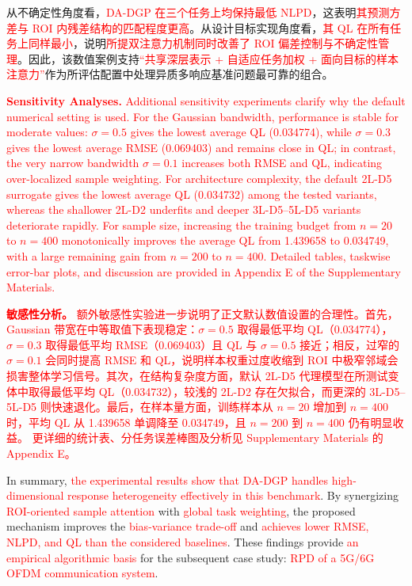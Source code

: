 \documentclass[11pt]{article}
\begin{document}
从不确定性角度看，\textcolor{red}{DA-DGP 在三个任务上均保持最低 NLPD}，这表明\textcolor{red}{其预测方差与 ROI 内残差结构的匹配程度更高}。从设计目标实现角度看，\textcolor{red}{其 QL 在所有任务上同样最小}，说明\textcolor{red}{所提双注意力机制同时改善了 ROI 偏差控制与不确定性管理}。因此，该数值案例支持\textcolor{red}{“共享深层表示 + 自适应任务加权 + 面向目标的样本注意力”}作为所评估配置中处理异质多响应基准问题最可靠的组合。

\textbf{\textcolor{red}{Sensitivity Analyses.}} \textcolor{red}{Additional sensitivity experiments clarify why the default numerical setting is used. For the Gaussian bandwidth, performance is stable for moderate values: $\sigma=0.5$ gives the lowest average QL (0.034774), while $\sigma=0.3$ gives the lowest average RMSE (0.069403) and remains close in QL; in contrast, the very narrow bandwidth $\sigma=0.1$ increases both RMSE and QL, indicating over-localized sample weighting. For architecture complexity, the default 2L-D5 surrogate gives the lowest average QL (0.034732) among the tested variants, whereas the shallower 2L-D2 underfits and deeper 3L-D5--5L-D5 variants deteriorate rapidly. For sample size, increasing the training budget from $n=20$ to $n=400$ monotonically improves the average QL from 1.439658 to 0.034749, with a large remaining gain from $n=200$ to $n=400$.} \textcolor{red}{Detailed tables, taskwise error-bar plots, and discussion are provided in Appendix E of the Supplementary Materials.}

\textbf{\textcolor{red}{敏感性分析。}} \textcolor{red}{额外敏感性实验进一步说明了正文默认数值设置的合理性。首先，Gaussian 带宽在中等取值下表现稳定：$\sigma=0.5$ 取得最低平均 QL（0.034774），$\sigma=0.3$ 取得最低平均 RMSE（0.069403）且 QL 与 $\sigma=0.5$ 接近；相反，过窄的 $\sigma=0.1$ 会同时提高 RMSE 和 QL，说明样本权重过度收缩到 ROI 中极窄邻域会损害整体学习信号。其次，在结构复杂度方面，默认 2L-D5 代理模型在所测试变体中取得最低平均 QL（0.034732），较浅的 2L-D2 存在欠拟合，而更深的 3L-D5--5L-D5 则快速退化。最后，在样本量方面，训练样本从 $n=20$ 增加到 $n=400$ 时，平均 QL 从 1.439658 单调降至 0.034749，且 $n=200$ 到 $n=400$ 仍有明显收益。} \textcolor{red}{更详细的统计表、分任务误差棒图及分析见 Supplementary Materials 的 Appendix E。}

In summary, \textcolor{red}{the experimental results show that DA-DGP handles high-dimensional response heterogeneity effectively in this benchmark}. By synergizing \textcolor{red}{ROI-oriented sample attention} with \textcolor{red}{global task weighting}, the proposed mechanism improves the \textcolor{red}{bias-variance trade-off} and \textcolor{red}{achieves lower RMSE, NLPD, and QL than the considered baselines}. These findings provide \textcolor{red}{an empirical algorithmic basis} for the subsequent case study: \textcolor{red}{RPD of a 5G/6G OFDM communication system}.
\end{document}
